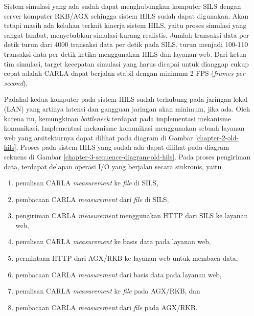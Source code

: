 Sistem simulasi yang ada sudah dapat menghubungkan komputer SILS dengan server
komputer RKB/AGX sehingga sistem HILS sudah dapat digunakan. Akan tetapi masih
ada keluhan terkait kinerja sistem HILS, yaitu proses simulasi yang sangat
lambat, menyebabkan simulasi kurang realistis. Jumlah transaksi data per
detik turun dari 4000 transaksi data per detik pada SILS, turun menjadi 100-110
transaksi data per detik ketika menggunakan HILS dan layanan web. Dari ketua tim
simulasi, target kecepatan simulasi yang harus dicapai untuk dianggap cukup
cepat adalah CARLA dapat berjalan stabil dengan minimum 2 FPS (\textit{frames
	per second}).

Padahal kedua komputer pada sistem HILS sudah terhubung pada jaringan lokal
(LAN) yang artinya latensi dan gangguan jaringan akan minimum, jika ada.
Oleh karena itu, kemungkinan \textit{bottleneck} terdapat pada implementasi
mekanisme komunikasi. Implementasi mekanisme komunikasi menggunakan sebuah
layanan web yang arsitekturnya dapat dilihat pada diagram di Gambar
\ref{chapter-2-old-hils}. Proses pada sistem HILS yang sudah ada dapat dilihat
pada diagram sekuens di Gambar \ref{chapter-3-sequence-diagram-old-hils}. Pada
proses pengiriman data, terdapat delapan operasi I/O yang berjalan secara
sinkronis, yaitu
\begin{enumerate}
	\item penulisan CARLA \textit{measurement} ke \textit{file} di SILS,
	\item pembacaan CARLA \textit{measurement} dari \textit{file} di SILS,
	\item pengiriman CARLA \textit{measurement} menggunakan HTTP dari SILS ke
	      layanan web,
	\item penulisan CARLA \textit{measurement} ke basis data pada layanan web,
	\item permintaan HTTP dari AGX/RKB ke layanan web untuk membaca data,
	\item pembacaan CARLA \textit{measurement} dari basis data pada layanan web,
	\item penulisan CARLA \textit{measurement} ke \textit{file} pada AGX/RKB,
	      dan
	\item pembacaan CARLA \textit{measurement} dari \textit{file} pada AGX/RKB.
\end{enumerate}

